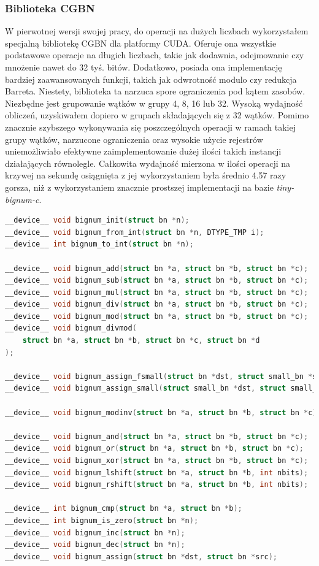 \subsubsection{Biblioteka CGBN}
W pierwotnej wersji swojej pracy, do operacji na dużych liczbach wykorzystałem specjalną bibliotekę CGBN dla platformy CUDA. Oferuje ona
wszystkie podstawowe operacje na długich liczbach, takie jak dodawnia, odejmowanie czy mnożenie nawet do 32 tyś. bitów.
Dodatkowo, posiada ona implementację bardziej zaawansowanych funkcji, takich jak odwrotność modulo czy redukcja Barreta.
Niestety, biblioteka ta narzuca spore ograniczenia pod kątem zasobów. Niezbędne jest grupowanie wątków w grupy
4, 8, 16 lub 32. Wysoką wydajność obliczeń, uzyskiwałem dopiero w grupach składających się z 32 wątków.
Pomimo znacznie szybszego wykonywania się poszczególnych operacji w ramach takiej grupy wątków, narzucone
ograniczenia oraz wysokie użycie rejestrów uniemożliwiało
efektywne zaimplementowanie dużej ilości takich instancji działających równolegle.
Całkowita wydajność mierzona w ilości operacji na krzywej na sekundę osiągnięta z jej wykorzystaniem była średnio 4.57 razy gorsza, niż
z wykorzystaniem znacznie prostszej implementacji na bazie \textit{tiny-bignum-c}.

\begin{lstlisting}[language=C, caption=Prototypy funkcji wykorzystywanych do operacji na długich liczbach]
__device__ void bignum_init(struct bn *n);
__device__ void bignum_from_int(struct bn *n, DTYPE_TMP i);
__device__ int bignum_to_int(struct bn *n);

__device__ void bignum_add(struct bn *a, struct bn *b, struct bn *c);
__device__ void bignum_sub(struct bn *a, struct bn *b, struct bn *c);
__device__ void bignum_mul(struct bn *a, struct bn *b, struct bn *c);
__device__ void bignum_div(struct bn *a, struct bn *b, struct bn *c);
__device__ void bignum_mod(struct bn *a, struct bn *b, struct bn *c);
__device__ void bignum_divmod(
    struct bn *a, struct bn *b, struct bn *c, struct bn *d
);

__device__ void bignum_assign_fsmall(struct bn *dst, struct small_bn *src);
__device__ void bignum_assign_small(struct small_bn *dst, struct small_bn *src);

__device__ void bignum_modinv(struct bn *a, struct bn *b, struct bn *c);

__device__ void bignum_and(struct bn *a, struct bn *b, struct bn *c);
__device__ void bignum_or(struct bn *a, struct bn *b, struct bn *c);
__device__ void bignum_xor(struct bn *a, struct bn *b, struct bn *c);
__device__ void bignum_lshift(struct bn *a, struct bn *b, int nbits);
__device__ void bignum_rshift(struct bn *a, struct bn *b, int nbits);

__device__ int bignum_cmp(struct bn *a, struct bn *b);
__device__ int bignum_is_zero(struct bn *n);
__device__ void bignum_inc(struct bn *n);
__device__ void bignum_dec(struct bn *n);
__device__ void bignum_assign(struct bn *dst, struct bn *src);
\end{lstlisting}

